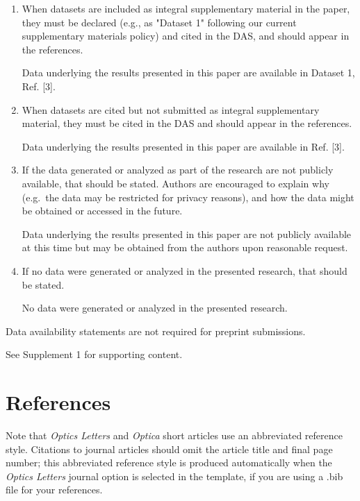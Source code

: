 \documentclass[9pt,twocolumn,twoside]{opticajnl}
\begin{document}
\begin{backmatter}
\begin{enumerate}
\item When datasets are included as integral supplementary material in the paper, they must be declared (e.g., as "Dataset 1" following our current supplementary materials policy) and cited in the DAS, and should appear in the references.

 Data underlying the results presented in this paper are available in Dataset 1, Ref. [3].

\item When datasets are cited but not submitted as integral supplementary material, they must be cited in the DAS and should appear in the references.

 Data underlying the results presented in this paper are available in Ref. [3].

\item If the data generated or analyzed as part of the research are not publicly available, that should be stated. Authors are encouraged to explain why (e.g.~the data may be restricted for privacy reasons), and how the data might be obtained or accessed in the future.

 Data underlying the results presented in this paper are not publicly available at this time but may be obtained from the authors upon reasonable request.

\item If no data were generated or analyzed in the presented research, that should be stated.

 No data were generated or analyzed in the presented research.
\end{enumerate}

\bigskip

\noindent Data availability statements are not required for preprint submissions.

See Supplement 1 for supporting content. 

\end{backmatter}

\section{References}

Note that \emph{Optics Letters} and \emph{Optica} short articles use an abbreviated reference style. Citations to journal articles should omit the article title and final page number; this abbreviated reference style is produced automatically when the \emph{Optics Letters} journal option is selected in the template, if you are using a .bib file for your references.
\end{document}
